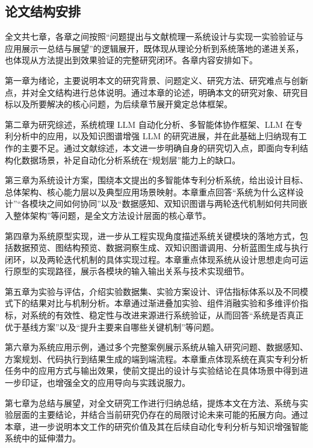 \subsection{论文结构安排}

全文共七章，各章之间按照“问题提出与文献梳理一系统设计与实现一实验验证与应用展示一总结与展望”的逻辑展开，既体现从理论分析到系统落地的递进关系，也体现从方法提出到效果验证的完整研究闭环。各章内容安排如下。

第一章为绪论，主要说明本文的研究背景、问题定义、研究方法、研究难点与创新点，并对全文结构进行总体说明。通过本章的论述，明确本文的研究对象、研究目标以及所要解决的核心问题，为后续章节展开奠定总体框架。

第二章为研究综述，系统梳理 LLM 自动化分析、多智能体协作框架、LLM 在专利分析中的应用，以及知识图谱增强 LLM 的研究进展，并在此基础上归纳现有工作的主要不足。通过文献综述，本文进一步明确自身的研究切入点，即面向专利结构化数据场景，补足自动化分析系统在“规划层”能力上的缺口。

第三章为系统设计方案，围绕本文提出的多智能体专利分析系统，给出设计目标、总体架构、核心能力层以及典型应用场景映射。本章重点回答“系统为什么这样设计”“各模块之间如何协同”以及“数据感知、双知识图谱与两轮迭代机制如何共同嵌入整体架构”等问题，是全文方法设计层面的核心章节。

第四章为系统原型实现，进一步从工程实现角度描述系统关键模块的落地方式，包括数据预览、图结构预览、数据洞察生成、双知识图谱调用、分析蓝图生成与执行闭环，以及两轮迭代机制的具体实现过程。本章重点体现系统从设计思想走向可运行原型的实现路径，展示各模块的输入输出关系与技术实现细节。

第五章为实验与评估，介绍实验数据集、实验方案设计、评估指标体系以及不同模式下的结果对比与机制分析。本章通过渐进叠加实验、组件消融实验和多维评价指标，对系统的有效性、稳定性与改进来源进行系统验证，从而回答“系统是否真正优于基线方案”以及“提升主要来自哪些关键机制”等问题。

第六章为系统应用示例，通过多个完整案例展示系统从输入研究问题、数据感知、方案规划、代码执行到结果生成的端到端流程。本章重点体现系统在真实专利分析任务中的应用方式与输出效果，使前文提出的设计与实验结论在具体场景中得到进一步印证，也增强全文的应用导向与实践说服力。

第七章为总结与展望，对全文研究工作进行归纳总结，提炼本文在方法、系统与实验层面的主要结论，并结合当前研究仍存在的局限讨论未来可能的拓展方向。通过本章，进一步说明本文工作的研究价值及其在后续自动化专利分析与知识增强智能系统中的延伸潜力。
